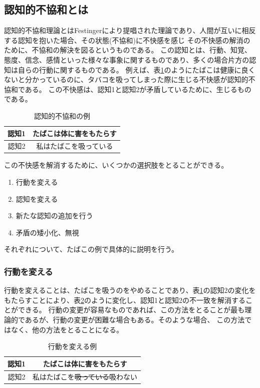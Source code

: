 \documentclass[11pt,a4j]{jreport}
\begin{document}
\subsection{認知的不協和とは} %
\label{sec: CDT}
認知的不協和理論\cite{Festinger1957}とはFestingerにより提唱された理論であり、人間が互いに相反する認知を抱いた場合、その状態(不協和)に不快感を感じ
その不快感の解消のために、不協和の解決を図るというものである。
この認知とは、行動、知覚、態度、信念、感情といった様々な事象に関するものであり、多くの場合片方の認知は自らの行動に関するものである。
例えば、表\ref{fig: CDTExample}のようにたばこは健康に良くないと分かっているのに、タバコを吸ってしまった際に生じる不快感が認知的不協和である。
この不快感は、認知1と認知2が矛盾しているために、生じるものである。
\begin{table}[H]
  \centering
  \begin{tabular}{c|c}
      認知1 & たばこは体に害をもたらす  \\ \hline
      認知2 & 私はたばこを吸っている \\ 
  \end{tabular}
  \caption{認知的不協和の例}
  \label{fig: CDTExample}
\end{table}


この不快感を解消するために、いくつかの選択肢をとることができる。
\begin{enumerate}
  \item 行動を変える
  \item 認知を変える
  \item 新たな認知の追加を行う
  \item 矛盾の矮小化、無視
\end{enumerate}
それぞれについて、たばこの例で具体的に説明を行う。
\subsubsection{行動を変える}
行動を変えることは、たばこを吸うのをやめることであり、表\ref{fig: CDTExample}の認知2の変化をもたらすことにより、表\ref{fig: ReduceDissonanceAction}のように変化し、認知1と認知2の不一致を解消することができる。
行動の変更が容易なものであれば、この方法をとることが最も理論的であるが、行動の変更が困難な場合もある。そのような場合、
この方法ではなく、他の方法をとることになる。
\begin{table}[h]
  \centering
  \begin{tabular}{c|c}

      認知1 & たばこは体に害をもたらす  \\ \hline
      認知2 & 私はたばこを\sout{吸っている}吸わない \\
  \end{tabular}
  \caption{行動を変える例}
  \label{fig: ReduceDissonanceAction}


\end{table}
\end{document}

